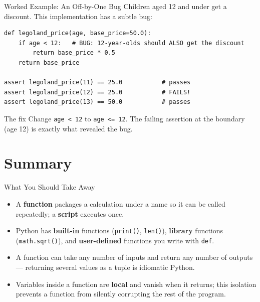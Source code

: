 \documentclass[9pt,aspectratio=169,xcolor=table]{beamer}
\begin{document}
\begin{frame}[fragile]{Worked Example: An Off-by-One Bug}
    \leavevmode
    Children aged 12 and under get a discount. This implementation has
    a subtle bug:

\begin{lstlisting}
def legoland_price(age, base_price=50.0):
    if age < 12:   # BUG: 12-year-olds should ALSO get the discount
        return base_price * 0.5
    return base_price

assert legoland_price(11) == 25.0           # passes
assert legoland_price(12) == 25.0           # FAILS!
assert legoland_price(13) == 50.0           # passes
\end{lstlisting}

    \vspace{1mm}
    \begin{alertblock}{The fix}
        Change \texttt{age < 12} to \texttt{age <= 12}. The failing
        assertion at the \alert{boundary} (age 12) is exactly what
        revealed the bug.
    \end{alertblock}
\end{frame}

\section{Summary}

\begin{frame}{What You Should Take Away}
    \leavevmode
    \small
    \begin{itemize}
        \item A \textbf{function} packages a calculation under a name so
              it can be called repeatedly; a \textbf{script} executes
              once.
        \item Python has \textbf{built-in} functions (\texttt{print()},
              \texttt{len()}), \textbf{library} functions
              (\texttt{math.sqrt()}), and \textbf{user-defined}
              functions you write with \texttt{def}.
        \item A function can take any number of inputs and return any
              number of outputs --- returning several values as a tuple
              is idiomatic Python.
        \item Variables inside a function are \textbf{local} and vanish
              when it returns; this isolation prevents a function from
              silently corrupting the rest of the program.
    \end{itemize}
\end{frame}
\end{document}

